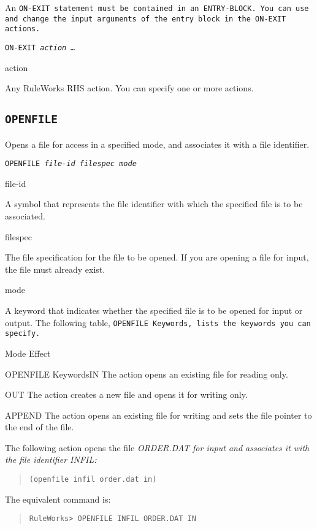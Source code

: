 {{An \tt{ON-EXIT} statement must be contained in an \tt{ENTRY-BLOCK}. You
can use and change the input arguments of the entry block in
the \tt{ON-EXIT} actions.

\Format

\tt{ON-EXIT} \it{action} \ldots

\begin{arguments}
\item[action]

  Any RuleWorks RHS action. You can specify one or more actions.
\end{arguments}

\subsection{\tt{OPENFILE}}

Opens a file for access in a specified mode, and associates it with a
file identifier.

\Format

\tt{OPENFILE} \it{file-id} \it{filespec} \it{mode}

\begin{arguments}
\item[file-id]

  A symbol that represents the file identifier with which the
  specified file is to be associated.

\item[filespec]

  The file specification for the file to be opened. If you are opening
  a file for input, the file must already exist.

\item[mode]

  A keyword that indicates whether the specified file is to be opened
  for input or output. The following table, \tt{OPENFILE} Keywords,
  lists the keywords you can specify.
\end{arguments}

Mode  Effect

OPENFILE KeywordsIN  The action opens an existing file for
reading only.

OUT  The action creates a new file and opens it for writing
only.

APPEND  The action opens an existing file for writing and
sets the file pointer to the end of the file.

\Example

The following action opens the file \it{ORDER.DAT} for input and
associates it with the file identifier \it{INFIL}:
\begin{quote}
\begin{verbatim}
(openfile infil order.dat in)
\end{verbatim}
\end{quote}
The equivalent command is:
\begin{quote}
\begin{verbatim}
RuleWorks> OPENFILE INFIL ORDER.DAT IN
\end{verbatim}
\end{quote}

}}
